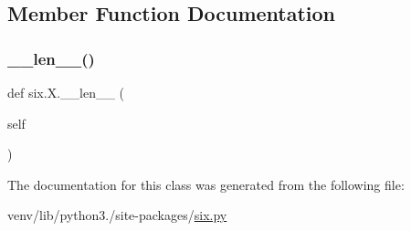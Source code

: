 \subsection{Member Function Documentation}
\mbox{\label{classsix_1_1X_a2a0c740ba10f5e755bc23009dc42dc3f}} 
\subsubsection{\texorpdfstring{\+\_\+\+\_\+len\+\_\+\+\_\+()}{\_\_len\_\_()}}
{\footnotesize\ttfamily def six.\+X.\+\_\+\+\_\+len\+\_\+\+\_\+ (\begin{DoxyParamCaption}\item[{}]{self }\end{DoxyParamCaption})}



The documentation for this class was generated from the following file\+:\begin{DoxyCompactItemize}
\item 
venv/lib/python3./site-\/packages/\hyperlink{six_8py}{six.\+py}\end{DoxyCompactItemize}
